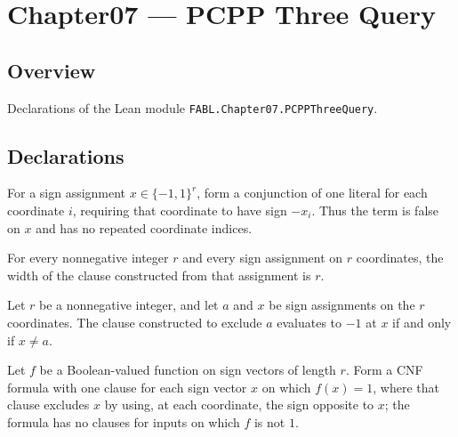 \chapter{Chapter07 — PCPP Three Query}
\section{Overview}

Declarations of the Lean module \texttt{FABL.Chapter07.PCPPThreeQuery}.

\section{Declarations}

\begin{definition}
\label{FABL.excludingClause}
\leanok
{}
For a sign assignment $x\in\{−1,1\}^r$, form a conjunction of one literal for each
coordinate $i$, requiring that coordinate to have sign $-x_i$. Thus the term is false on
$x$ and has no repeated coordinate indices.
\end{definition}

\begin{theorem}
\label{FABL.excludingClause_width}
\leanok
{}
For every nonnegative integer $r$ and every sign assignment on $r$ coordinates, the
width of the clause constructed from that assignment is $r$.
\end{theorem}

\begin{theorem}
\label{FABL.excludingClause_eval_eq_neg_one_iff}
\leanok
{}
Let $r$ be a nonnegative integer, and let $a$ and $x$ be sign assignments on the $r$
coordinates. The clause constructed to exclude $a$ evaluates to $−1$ at $x$ if and only
if $x\ne a$.
\end{theorem}

\begin{definition}
\label{FABL.truthTableCNF}
\leanok
{}
Let $f$ be a Boolean-valued function on sign vectors of length $r$. Form a CNF formula
with one clause for each sign vector $x$ on which $f(x)=1$, where that clause excludes
$x$ by using, at each coordinate, the sign opposite to $x$; the formula has no clauses
for inputs on which $f$ is not $1$.
\end{definition}

